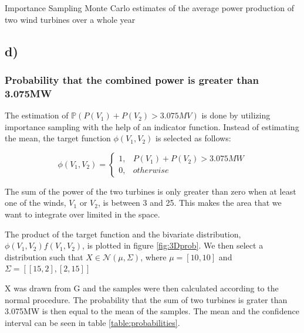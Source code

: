 \documentclass[a4paper]{article}
\begin{document}
\begin{table}[H]
    \centering
    \caption{Importance Sampling Monte Carlo estimates of the average power production of two wind turbines over a whole year}
    \label{tab:multivarRes}
    
\end{table}

\subsection*{d)}

\subsubsection*{Probability that the combined power is greater than 3.075MW}

The estimation of $\mathbb{P}(P(V_1) + P(V_2) > 3.075MV)$ is done by utilizing importance sampling with the help of an indicator function. Instead of estimating the mean, the target function $\phi(V_1, V_2)$ is selected as follows:

\begin{equation}
    \phi(V_1, V_2)=\begin{cases}
        1, & P(V_1) + P(V_2) > 3.075MW\\ 
        0, & otherwise 
    \end{cases}
\end{equation}

The sum of the power of the two turbines is only greater than zero when at least one of the winds, $V_1$ or $V_2$, is between 3 and 25. This makes the area that we want to integrate over limited in the space. 

The product of the target function and the bivariate distribution, $\phi(V_1, V_2)f(V_1, V_2)$, is plotted in figure \ref{fig:3Dprob}. We then select a distribution such that $X \in \mathcal{N}(\mu, \Sigma)$, where $\mu = [10,10]$ and $\Sigma = [[15, 2], [2, 15]]$

X was drawn from G and the samples were then calculated according to the normal procedure. The probability that the sum of two turbines is grater than 3.075MW is then equal to the mean of the samples. The mean and the confidence interval can be seen in table \ref{table:probabilities}.
\end{document}
